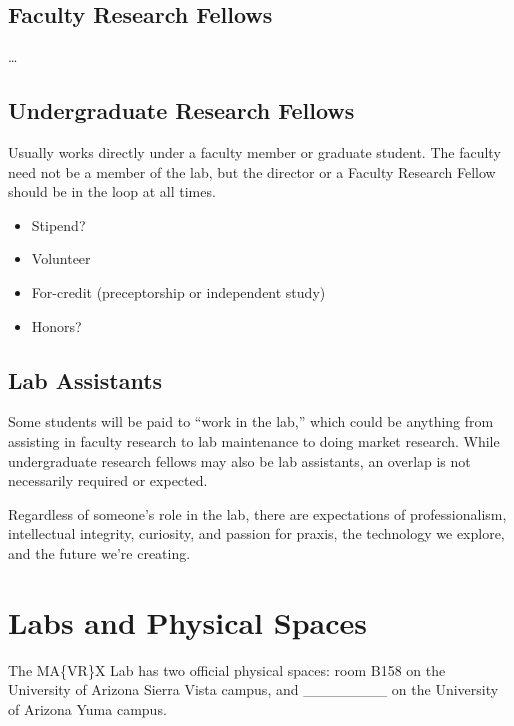 \documentclass[
]{book}
\providecommand{\tightlist}{%
  \setlength{\itemsep}{0pt}\setlength{\parskip}{0pt}}
\begin{document}
\hypertarget{faculty-research-fellows}{%
\section{Faculty Research Fellows}\label{faculty-research-fellows}}

\ldots{}

\hypertarget{undergraduate-research-fellows}{%
\section{Undergraduate Research Fellows}\label{undergraduate-research-fellows}}

Usually works directly under a faculty member or graduate student. The faculty need not be a member of the lab, but the director or a Faculty Research Fellow should be in the loop at all times.

\begin{itemize}
\tightlist
\item
  Stipend?
\item
  Volunteer
\item
  For-credit (preceptorship or independent study)
\item
  Honors?
\end{itemize}

\hypertarget{lab-assistants}{%
\section{Lab Assistants}\label{lab-assistants}}

Some students will be paid to ``work in the lab,'' which could be anything from assisting in faculty research to lab maintenance to doing market research. While undergraduate research fellows may also be lab assistants, an overlap is not necessarily required or expected.

Regardless of someone's role in the lab, there are expectations of professionalism, intellectual integrity, curiosity, and passion for praxis, the technology we explore, and the future we're creating.

\hypertarget{spaces}{%
\chapter{Labs and Physical Spaces}\label{spaces}}

The MA\{VR\}X Lab has two official physical spaces: room B158 on the University of Arizona Sierra Vista campus, and \_\_\_\_\_\_\_\_ on the University of Arizona Yuma campus.
\end{document}
